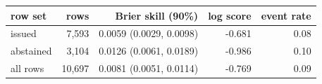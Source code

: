 \begin{tabular}{lrrrr}
\toprule
row set & rows & Brier skill (90\%) & log score & event rate \\
\midrule
issued & 7,593 & 0.0059 (0.0029, 0.0098) & -0.681 & 0.08 \\
abstained & 3,104 & 0.0126 (0.0061, 0.0189) & -0.986 & 0.10 \\
all rows & 10,697 & 0.0081 (0.0051, 0.0114) & -0.769 & 0.09 \\
\bottomrule
\end{tabular}
